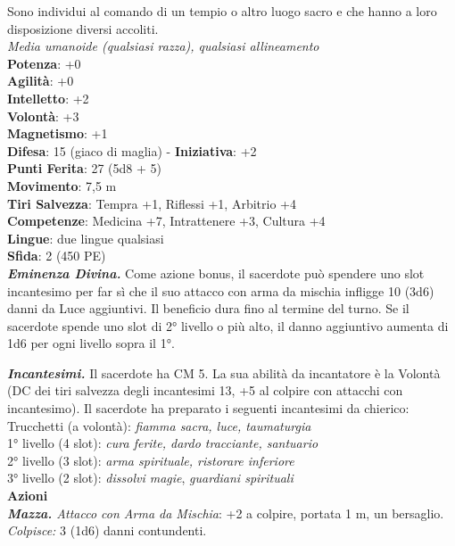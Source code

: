 \begin{multicols}{2}
Sono individui al comando di un tempio o altro luogo sacro e che hanno a loro disposizione diversi accoliti.\\
\emph{Media umanoide (qualsiasi razza), qualsiasi allineamento}\\
\textbf{Potenza}: +0\\
\textbf{Agilità}: +0\\
\textbf{Intelletto}: +2\\
\textbf{Volontà}: +3\\
\textbf{Magnetismo}: +1\\
\textbf{Difesa}: 15 (giaco di maglia) - \textbf{Iniziativa}: +2\\
\textbf{Punti Ferita}: 27 (5d8 + 5)\\
\textbf{Movimento}: 7,5 m\\
\textbf{Tiri Salvezza}: Tempra +1, Riflessi +1, Arbitrio +4 \\
\textbf{Competenze}: Medicina +7, Intrattenere +3, Cultura +4\\
\textbf{Lingue}: due lingue qualsiasi\\
\textbf{Sfida}: 2 (450 PE)\smallskip\\
\emph{\textbf{Eminenza Divina.}} Come azione bonus, il sacerdote può spendere uno slot incantesimo per far sì che il suo attacco con arma da mischia infligge 10 (3d6) danni da Luce aggiuntivi. Il beneficio dura fino al termine del turno. Se il sacerdote spende uno slot di 2° livello o più alto, il danno aggiuntivo aumenta di 1d6 per ogni livello sopra il 1°.

\emph{\textbf{Incantesimi.}} Il sacerdote ha CM 5. La sua abilità da incantatore è la Volontà (DC dei tiri salvezza degli incantesimi 13, +5 al colpire con attacchi con incantesimo). Il sacerdote ha preparato i seguenti incantesimi da chierico: \\
Trucchetti (a volontà): \emph{fiamma sacra, luce, taumaturgia}\\
1° livello (4 slot): \emph{cura ferite, dardo tracciante, santuario}\\
2° livello (3 slot): \emph{arma spirituale, ristorare inferiore}\\
3° livello (2 slot): \emph{dissolvi magie}, \emph{guardiani spirituali}\\
\smallskip\textbf{Azioni}\\
\emph{\textbf{Mazza.} Attacco con Arma da Mischia}: +2 a colpire, portata 1 m, un bersaglio.\\
\emph{Colpisce:} 3 (1d6) danni contundenti.\\


\end{multicols}
